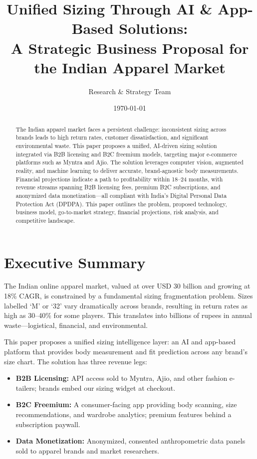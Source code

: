 \documentclass[12pt,a4paper]{article}
\title{Unified Sizing Through AI \& App-Based Solutions:\\A Strategic Business Proposal for the Indian Apparel Market}
\author{Research \& Strategy Team}
\date{\today}
\begin{document}
\maketitle

\begin{abstract}
The Indian apparel market faces a persistent challenge: inconsistent sizing across brands leads to high return rates, customer dissatisfaction, and significant environmental waste. This paper proposes a unified, AI-driven sizing solution integrated via B2B licensing and B2C freemium models, targeting major e-commerce platforms such as Myntra and Ajio. The solution leverages computer vision, augmented reality, and machine learning to deliver accurate, brand-agnostic body measurements. Financial projections indicate a path to profitability within 18--24 months, with revenue streams spanning B2B licensing fees, premium B2C subscriptions, and anonymized data monetization---all compliant with India's Digital Personal Data Protection Act (DPDPA). This paper outlines the problem, proposed technology, business model, go-to-market strategy, financial projections, risk analysis, and competitive landscape.
\end{abstract}

\section{Executive Summary}

The Indian online apparel market, valued at over USD 30 billion and growing at 18\% CAGR, is constrained by a fundamental sizing fragmentation problem. Sizes labelled `M' or `32' vary dramatically across brands, resulting in return rates as high as 30--40\% for some players. This translates into billions of rupees in annual waste---logistical, financial, and environmental.

This paper proposes a unified sizing intelligence layer: an AI and app-based platform that provides body measurement and fit prediction across any brand's size chart. The solution has three revenue legs:

\begin{itemize}
    \item \textbf{B2B Licensing:} API access sold to Myntra, Ajio, and other fashion e-tailers; brands embed our sizing widget at checkout.
    \item \textbf{B2C Freemium:} A consumer-facing app providing body scanning, size recommendations, and wardrobe analytics; premium features behind a subscription paywall.
    \item \textbf{Data Monetization:} Anonymized, consented anthropometric data panels sold to apparel brands and market researchers.
\end{itemize}
\end{document}
